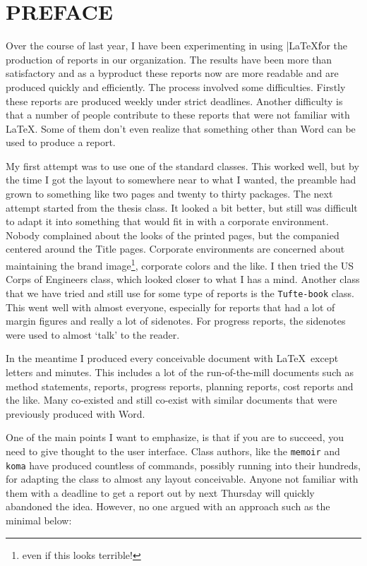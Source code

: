 \chapter{PREFACE}

Over the course of last year, I have been experimenting in using |\LaTeX\| for the production of reports in our
organization. The results have been more than satisfactory and as a byproduct these reports now are more
readable and are produced quickly and efficiently. The process involved some difficulties. Firstly these reports
are produced weekly under strict deadlines. Another difficulty is that a number of people contribute
to these reports that were not familiar with \LaTeX. Some of them don't even realize that something other
than Word can be used to produce a report.

My first attempt was to use one of the standard classes. This worked well, but by the time I got the layout to somewhere near to what I wanted, the preamble had grown to something like two pages and twenty to thirty packages. The next attempt started from the thesis class. It looked a bit better, but still was difficult to adapt it into something that would fit in with a  corporate environment. Nobody complained about the looks of the printed pages, but the companied centered around the Title pages. Corporate environments are concerned about maintaining the brand image\footnote{even if this looks terrible!}, corporate colors and the like. I then tried the US Corps of Engineers class, which looked closer to what I has a mind. Another class that we have tried and still use for some type of reports is the \texttt{Tufte-book} class. This went well with almost everyone, especially for reports that had a lot of margin figures and really a lot of sidenotes. For progress reports, the sidenotes were used to almost `talk' to the reader.

In the meantime I produced every conceivable document with \LaTeX\, except letters and minutes. This includes a lot of the run-of-the-mill documents such as method statements, reports, progress reports, planning reports, cost reports and the like. Many co-existed and still co-exist with similar documents that were previously produced with Word.

One of the main points I want to emphasize, is that if you are to succeed, you need to give thought to the user interface. Class authors, like the \texttt{memoir} and \texttt{koma} have produced countless of commands, possibly running into their hundreds, for adapting the class to almost any layout conceivable. Anyone not familiar with them with a deadline to get a report out by next Thursday will quickly abandoned the idea. However, no one argued with an approach such as the minimal below:

